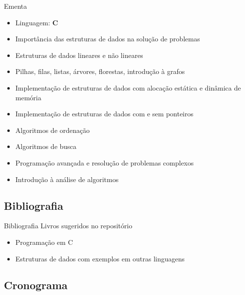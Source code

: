 \documentclass[10pt]{beamer}
\begin{document}
\begin{frame}{Ementa}
    \begin{itemize}
        \item Linguagem: \textbf{C}
        \item Importância das estruturas de dados na solução de problemas
        \item Estruturas de dados lineares e não lineares
        \item Pilhas, filas, listas, árvores, florestas, introdução à grafos
        \item Implementação de estruturas de dados com alocação estática e dinâmica de memória
        \item Implementação de estruturas de dados com e sem ponteiros
        \item Algoritmos de ordenação
        \item Algoritmos de busca
        \item Programação avançada e resolução de problemas complexos
        \item Introdução à análise de algoritmos
    \end{itemize}
\end{frame}

\subsection{Bibliografia}

\begin{frame}{Bibliografia}
    \huge
    Livros sugeridos no \alert{repositório}

    \Large
    \begin{itemize}
        \item Programação em C
        \item Estruturas de dados com exemplos em outras linguagens
    \end{itemize}
\end{frame}

\subsection{Cronograma}
\end{document}
